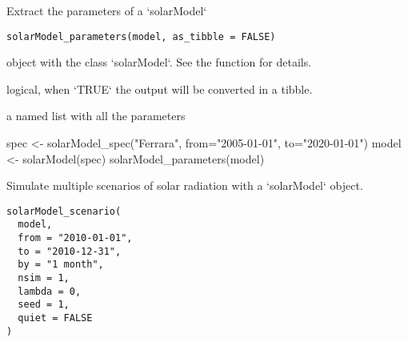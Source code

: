 \documentclass[a4paper]{book}
\begin{document}
%
\begin{Description}\relax
Extract the parameters of a `solarModel`
\end{Description}
%
\begin{Usage}
\begin{verbatim}
solarModel_parameters(model, as_tibble = FALSE)
\end{verbatim}
\end{Usage}
%
\begin{Arguments}
\begin{ldescription}
\item[\code{model}] object with the class `solarModel`. See the function  for details.

\item[\code{as\_tibble}] logical, when `TRUE` the output will be converted in a tibble.
\end{ldescription}
\end{Arguments}
%
\begin{Value}
a named list with all the parameters
\end{Value}
%
\begin{Examples}
\begin{ExampleCode}
spec <- solarModel_spec("Ferrara", from="2005-01-01", to="2020-01-01")
model <- solarModel(spec)
solarModel_parameters(model)

\end{ExampleCode}
\end{Examples}
%
\begin{Description}\relax
Simulate multiple scenarios of solar radiation with a `solarModel` object.
\end{Description}
%
\begin{Usage}
\begin{verbatim}
solarModel_scenario(
  model,
  from = "2010-01-01",
  to = "2010-12-31",
  by = "1 month",
  nsim = 1,
  lambda = 0,
  seed = 1,
  quiet = FALSE
)
\end{verbatim}
\end{Usage}
%
\end{document}
